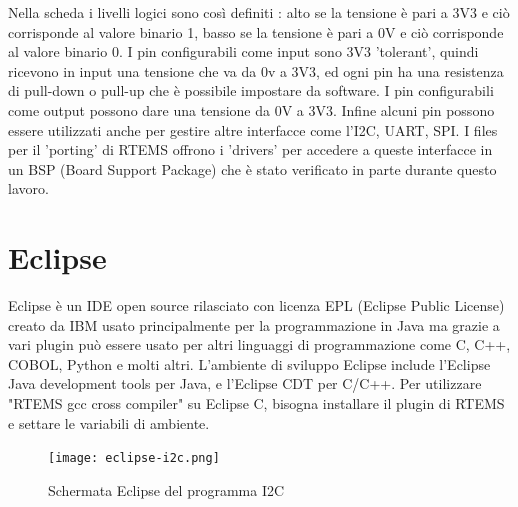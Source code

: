 \documentclass[12pt, a4paper, titlepage, oneside]{book}
\begin{document}
Nella scheda i livelli logici sono così definiti : alto se la tensione è pari a 3V3 e ciò corrisponde al valore binario 1, basso se la tensione è pari a 0V e ciò corrisponde al valore binario 0.\newline 
I pin configurabili come input sono 3V3 'tolerant', quindi ricevono in input una tensione che va da 0v a 3V3, ed ogni pin ha una resistenza di pull-down o pull-up che è possibile impostare da software.
I pin configurabili come output possono dare una tensione da 0V a 3V3.\newline
Infine alcuni pin possono essere utilizzati anche per gestire altre interfacce come l'I2C, UART, SPI.\newline
I files per il 'porting' di RTEMS offrono i 'drivers' per accedere a queste interfacce in un BSP (Board Support Package) che è stato verificato in parte durante questo lavoro.
\newpage
\section{Eclipse}
Eclipse è un IDE open source rilasciato con licenza EPL (Eclipse Public License) creato da IBM usato principalmente per la programmazione in Java ma grazie a vari plugin può essere usato per altri linguaggi di programmazione come C, C++, COBOL, Python e molti altri. \newline
L'ambiente di sviluppo Eclipse include l'Eclipse Java development tools per Java, e l'Eclipse CDT per C/C++. \newline
Per utilizzare "RTEMS gcc cross compiler" su Eclipse C, bisogna installare il plugin di RTEMS e settare le variabili di ambiente.
\begin{figure} [h]
    \centering
    \texttt{[image: eclipse-i2c.png]}
    \caption{Schermata Eclipse del programma I2C }
    \label{fig:eclips-i2c}
\end{figure}
\end{document}
